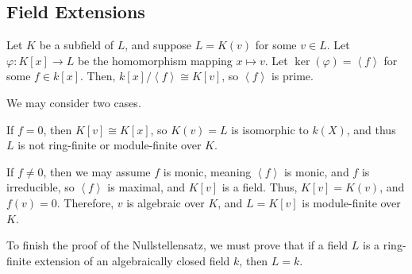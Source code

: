 \documentclass[10pt]{mypackage}
\begin{document}
\subsection{Field Extensions}%
Let $K$ be a subfield of $L$, and suppose $L = K(v)$ for some $v\in L$. Let $\varphi\colon K\left[ x \right]\rightarrow L$ be the homomorphism mapping $x\mapsto v$. Let $\ker\left( \varphi \right) = \left\langle f \right\rangle$ for some $f\in k\left[ x \right]$. Then, $k\left[ x \right]/\left\langle f \right\rangle\cong K\left[ v \right]$, so $\left\langle f \right\rangle$ is prime.\newline

We may consider two cases.
\begin{description}[font=\normalfont]
  \item[Case 1:] If $f = 0$, then $K\left[ v \right]\cong K\left[ x \right]$, so $K\left( v \right) = L$ is isomorphic to $k\left( X \right)$, and thus $L$ is not ring-finite or module-finite over $K$.
  \item[Case 2:] If $f\neq 0$, then we may assume $f$ is monic, meaning $\left\langle f \right\rangle$ is monic, and $f$ is irreducible, so $\left\langle f \right\rangle$ is maximal, and $K\left[ v \right]$ is a field. Thus, $K\left[ v \right] = K\left( v \right)$, and $f\left( v \right) = 0$. Therefore, $v$ is algebraic over $K$, and $L=K\left[ v \right]$ is module-finite over $K$.
\end{description}
To finish the proof of the Nullstellensatz, we must prove that if a field $L$ is a ring-finite extension of an algebraically closed field $k$, then $L = k$.\newline
\end{document}
